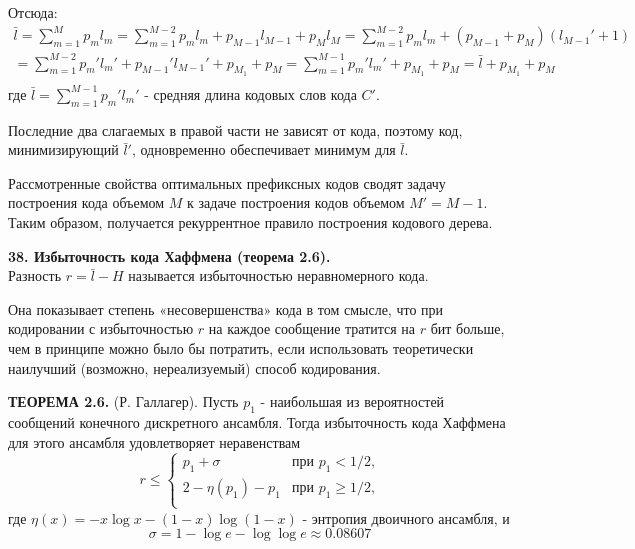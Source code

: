 \documentclass[14pt]{article}
\begin{document}
Отсюда:
\begin{displaymath}
    \begin{aligned}
    \bar{l} = \sum_{m=1}^{M} p_m l_m = \sum_{m=1}^{M-2} p_m l_m + p_{M-1} l_{M-1} + p_{M} l_{M} = \sum_{m=1}^{M-2} p_m l_m + (p_{M-1} + p_M)(l_{M-1}' + 1) \\
        = \sum_{m=1}^{M-2} p_m' l_m' + p_{M-1}' l_{M-1}' + p_{M_1} + p_{M} = \sum_{m=1}^{M-1} p_m' l_m' + p_{M_1} + p_{M} = \bar{l} + p_{M_1} + p_{M} \\
    \end{aligned}
\end{displaymath}
где \(\bar{l} = \displaystyle\sum_{m=1}^{M-1} p_m' l_m'\) - средняя длина кодовых слов кода \(C'\).

Последние два слагаемых в правой части не зависят от кода, поэтому код, минимизирующий \(\bar{l}'\), одновременно обеспечивает
минимум для \(\bar{l}\).

Рассмотренные свойства оптимальных префиксных кодов сводят задачу построения кода объемом \(M\) к задаче построения кодов объемом \(M' = M - 1\). Таким образом, получается рекуррентное правило построения кодового дерева.


\bigskip
\textbf{38. Избыточность кода Хаффмена (теорема 2.6).} \\

Разность \(r = \bar{l} - H\) называется избыточностью неравномерного кода.

Она показывает степень «несовершенства» кода в том смысле, что при кодировании с избыточностью \(r\) на каждое сообщение тратится на \(r\) бит больше, чем в принципе можно было бы потратить, если использовать теоретически наилучший (возможно, нереализуемый) способ кодирования.

\textbf{ТЕОРЕМА 2.6.} (Р. Галлагер). Пусть \(p_1\) - наибольшая из вероятностей сообщений конечного дискретного ансамбля. Тогда избыточность кода Хаффмена для этого ансамбля удовлетворяет неравенствам
\begin{displaymath}
r \leq \left\{ \begin{array}{ll}
    p_1 + \sigma & \textrm{при \(p_1 < 1/2\),}\\
    2 - \eta(p_1) - p_1 & \textrm{при \(p_1 \geq 1/2\),}\\
  \end{array} \right.
\end{displaymath}
где \(\eta(x) = -x \log x - (1 - x)\log(1 - x)\) - энтропия двоичного ансамбля, и
\begin{displaymath}
    \sigma = 1 - \log e - \log \log e \approx 0.08607
\end{displaymath}
\end{document}
